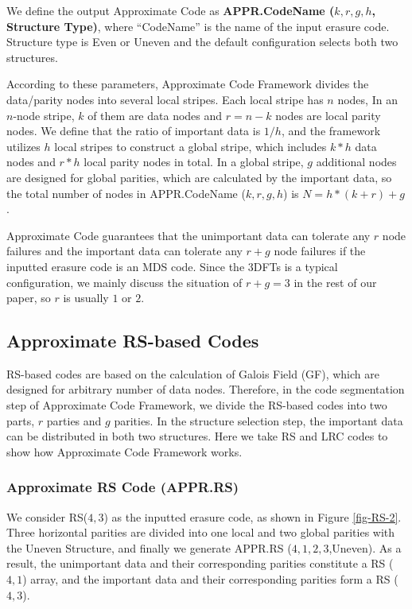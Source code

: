 \documentclass[sigconf]{acmart}
\begin{document}
We define the output Approximate Code as \textbf{APPR.CodeName ($k,r,g,h$, Structure Type)}, where ``CodeName'' is the name of the input erasure code. Structure type is Even or Uneven and the default configuration selects both two structures.

According to these parameters, Approximate Code Framework divides the data/parity nodes into several local stripes. Each local stripe has $n$ nodes,  
In an $n$-node stripe, $k$ of them are data nodes and $r=n-k$ nodes are local parity nodes.
We define that the ratio of important data is $1/h$, and the framework utilizes $h$ local stripes to construct a global stripe, which includes $k*h$ data nodes and $r*h$ local parity nodes in total.
In a global stripe, $g$ additional nodes are designed for global parities, which are calculated by the important data, so the total number of nodes in APPR.CodeName ($k,r,g,h$) is
$N= h*(k+r) + g$.

Approximate Code guarantees that the unimportant data can tolerate any $r$ node failures and the important data can tolerate any $r+g$ node failures if the inputted erasure code is an MDS code.
Since the 3DFTs is a typical configuration, we mainly discuss the situation of $r+g=3$ in the rest of our paper, so $r$ is usually $1$ or $2$.

\subsection{Approximate RS-based Codes}\label{appr-rsbased}
RS-based codes are based on the calculation of Galois Field (GF), which are designed for arbitrary number of data nodes. Therefore, in the code segmentation step of  Approximate Code Framework, we divide the RS-based codes into two parts, $r$ parties and $g$ parities. In the structure selection step, the important data can be distributed in both two structures. Here we take RS and LRC codes to show how Approximate Code Framework works.

\subsubsection{Approximate RS Code (APPR.RS)}
We consider RS($4,3$) as the inputted erasure code, as shown in Figure \ref{fig-RS-2}. Three horizontal parities are divided into one local and two global parities with the Uneven Structure, and finally we generate APPR.RS ($4,1,2,3$,Uneven).
As a result, the unimportant data and their corresponding parities constitute a RS ($4,1$) array, and the important data and their corresponding parities form a RS ($4,3$).
\end{document}

